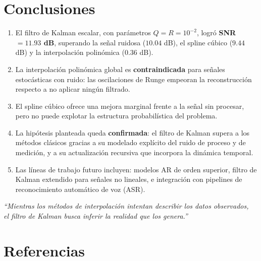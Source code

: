 \documentclass[12pt,a4paper]{article}
\begin{document}
\section{Conclusiones}

\begin{enumerate}
  \item El filtro de Kalman escalar, con parámetros $Q = R = 10^{-2}$, logró
        \textbf{SNR $= 11.93$ dB}, superando la señal ruidosa ($10.04$ dB),
        el spline cúbico ($9.44$ dB) y la interpolación polinómica ($0.36$ dB).

  \item La interpolación polinómica global es \textbf{contraindicada} para señales
        estocásticas con ruido: las oscilaciones de Runge empeoran la reconstrucción
        respecto a no aplicar ningún filtrado.

  \item El spline cúbico ofrece una mejora marginal frente a la señal sin procesar,
        pero no puede explotar la estructura probabilística del problema.

  \item La hipótesis planteada queda \textbf{confirmada}: el filtro de Kalman supera
        a los métodos clásicos gracias a su modelado explícito del ruido de proceso
        y de medición, y a su actualización recursiva que incorpora la dinámica temporal.

  \item Las líneas de trabajo futuro incluyen: modelos AR de orden superior,
        filtro de Kalman extendido para señales no lineales, e integración con
        pipelines de reconocimiento automático de voz (ASR).
\end{enumerate}

\vspace{1em}
\begin{center}
\textit{``Mientras los métodos de interpolación intentan describir los datos observados,}\\
\textit{el filtro de Kalman busca inferir la realidad que los genera.''}
\end{center}

\section*{Referencias}
\end{document}
